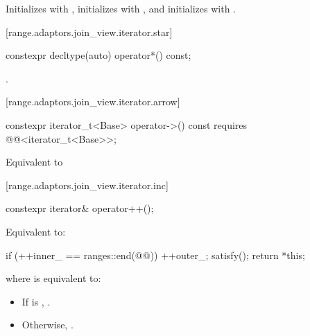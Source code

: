 \begin{itemdescr}
\pnum
\effects Initializes  with , initializes
 with , and initializes  with
.
\end{itemdescr}

[range.adaptors.join_view.iterator.star]{}

\begin{itemdecl}
constexpr decltype(auto) operator*() const;
\end{itemdecl}

\begin{itemdescr}
\pnum
\returns {}.
\end{itemdescr}

{\color{newclr}
[range.adaptors.join_view.iterator.arrow]{}

\begin{itemdecl}
constexpr iterator_t<Base> operator->() const
  requires @@<iterator_t<Base>>;
\end{itemdecl}

\begin{itemdescr}
\pnum
\effects Equivalent to 
\end{itemdescr}
} %

[range.adaptors.join_view.iterator.inc]{}

\begin{itemdecl}
constexpr iterator& operator++();
\end{itemdecl}

\begin{itemdescr}
\pnum
\effects Equivalent to:
\begin{codeblock}
if (++inner_ == ranges::end(@@)) {
  ++outer_;
  satisfy();
}
return *this;
\end{codeblock}

where  is equivalent to:
\begin{itemize}
\item If  is , .
\item Otherwise, .
\end{itemize}
\end{itemdescr}

